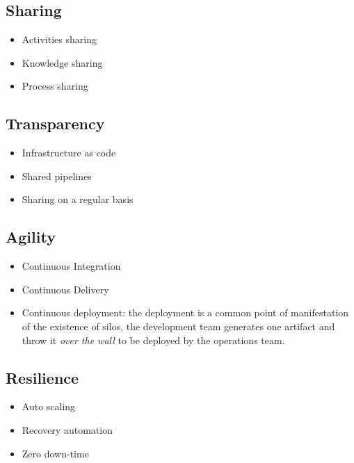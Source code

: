 \subsection{Sharing}
\begin{itemize}
\item Activities sharing
\item Knowledge sharing
\item Process sharing
\end{itemize}

\subsection{Transparency}
\begin{itemize}
\item Infrastructure as code
\item Shared pipelines
\item Sharing on a regular basis
\end{itemize}

\subsection{Agility}
\begin{itemize}
\item Continuous Integration
\item Continuous Delivery
\item Continuous deployment: the deployment is a common point of manifestation of the existence of silos, the development team generates one artifact and throw it \textit{over the wall} to be deployed by the operations team.
\end{itemize}

\subsection{Resilience}
\begin{itemize}
\item Auto scaling
\item Recovery automation
\item Zero down-time
\end{itemize}
